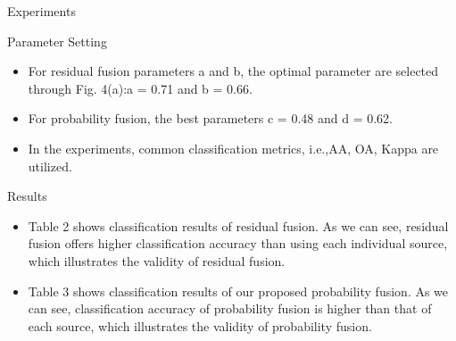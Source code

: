 \documentclass{beamer}
\begin{document}
\begin{frame}{Experiments}
    \begin{block}{Parameter Setting}
      \begin{itemize}
          \item For residual fusion parameters a and b,  the optimal parameter are selected through Fig.   4(a):a = 0.71 and b = 0.66.
          \item For probability fusion, the best parameters c = 0.48 and d = 0.62.
          \item In  the  experiments,  common  classification  metrics,  i.e.,AA, OA, Kappa are utilized.
      \end{itemize}
    \end{block}
    \begin{block}{Results}
    \begin{itemize}
        \item Table  2  shows  classification  results  of  residual  fusion.   As we can see, residual fusion offers higher classification accuracy than using each individual source, which illustrates the validity of residual fusion.
        \item Table 3 shows classification results of our proposed probability fusion.  As we can see, classification accuracy of probability fusion is higher than that of each source, which illustrates the validity of probability fusion.
    \end{itemize}
    \end{block}
\end{frame}
\end{document}
